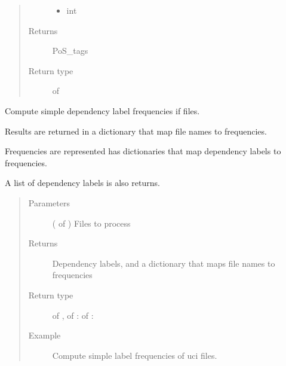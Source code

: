 \documentclass[letterpaper,10pt,english]{sphinxmanual}
\begin{document}
\begin{fulllineitems}
\begin{quote}
\begin{description}
\begin{itemize}
\item {} 
 \textendash{} int

\end{itemize}

\item[{Returns}] \leavevmode
PoS\_tags

\item[{Return type}] \leavevmode
{} of 

\end{description}\end{quote}

\end{fulllineitems}


\begin{fulllineitems}
\label{\detokenize{analysis:loacore.analysis.frequencies.label_frequencies}}
Compute simple dependency label frequencies if files.

Results are returned in a dictionary that map file names to frequencies.

Frequencies are represented has dictionaries that map dependency labels to frequencies.

A list of dependency labels is also returns.
\begin{quote}\begin{description}
\item[{Parameters}] \leavevmode
{} ( of {\hyperref[\detokenize{classes:loacore.classes.classes.File}]{}}) \textendash{} Files to process

\item[{Returns}] \leavevmode
Dependency labels, and a dictionary that maps file names to frequencies

\item[{Return type}] \leavevmode
{} of  ,  of  :  of  : 

\item[{Example}] \leavevmode
Compute simple label frequencies of uci files.

\end{description}\end{quote}

\end{fulllineitems}
\end{document}
